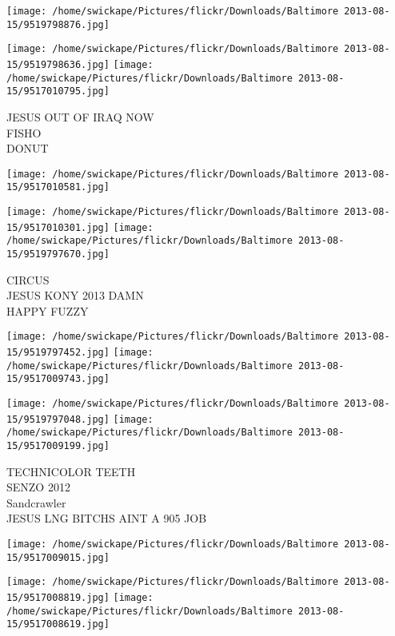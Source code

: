 \documentclass[10pt,letterpaper]{article}
\begin{document}
\texttt{[image: /home/swickape/Pictures/flickr/Downloads/Baltimore 2013-08-15/9519798876.jpg]}

\vspace{0.25in}
\texttt{[image: /home/swickape/Pictures/flickr/Downloads/Baltimore 2013-08-15/9519798636.jpg]}
\texttt{[image: /home/swickape/Pictures/flickr/Downloads/Baltimore 2013-08-15/9517010795.jpg]}

JESUS OUT OF IRAQ NOW\\
FISHO\\
DONUT\\
\pagebreak

\texttt{[image: /home/swickape/Pictures/flickr/Downloads/Baltimore 2013-08-15/9517010581.jpg]}

\vspace{0.25in}
\texttt{[image: /home/swickape/Pictures/flickr/Downloads/Baltimore 2013-08-15/9517010301.jpg]}
\texttt{[image: /home/swickape/Pictures/flickr/Downloads/Baltimore 2013-08-15/9519797670.jpg]}

CIRCUS\\
JESUS KONY 2013 DAMN\\
HAPPY FUZZY\\
\pagebreak

\texttt{[image: /home/swickape/Pictures/flickr/Downloads/Baltimore 2013-08-15/9519797452.jpg]}
\texttt{[image: /home/swickape/Pictures/flickr/Downloads/Baltimore 2013-08-15/9517009743.jpg]}

\texttt{[image: /home/swickape/Pictures/flickr/Downloads/Baltimore 2013-08-15/9519797048.jpg]}
\texttt{[image: /home/swickape/Pictures/flickr/Downloads/Baltimore 2013-08-15/9517009199.jpg]}

TECHNICOLOR TEETH\\
SENZO 2012\\
Sandcrawler\\
JESUS LNG BITCHS AINT A 905 JOB\\
\pagebreak

\texttt{[image: /home/swickape/Pictures/flickr/Downloads/Baltimore 2013-08-15/9517009015.jpg]}

\vspace{0.25in}
\texttt{[image: /home/swickape/Pictures/flickr/Downloads/Baltimore 2013-08-15/9517008819.jpg]}
\texttt{[image: /home/swickape/Pictures/flickr/Downloads/Baltimore 2013-08-15/9517008619.jpg]}
\end{document}
